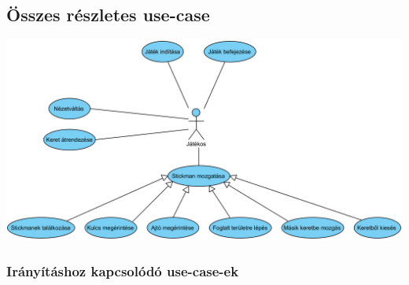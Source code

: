 	\subsection{Összes részletes use-case}
        \newcommand{\ucitem}[1]{\item \textbf{Név: #1}\\}
        \newcommand{\ucdesc}[1]{\textbf{Rövid leírás: } #1\\}
        \newcommand{\ucact}[1]{\textbf{Actor: } #1\\}
        \newcommand{\ucscenario}[1]{\textbf{Forgatókönyv: }#1\\}
        
		\begin{center}	
		    \includegraphics[scale=0.9]{resources/player.png}
		\end{center}        
        
        \subsubsection{Irányításhoz kapcsolódó use-case-ek} 
		
